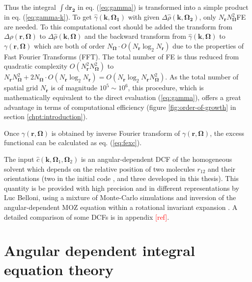 Thus the integral $\int\mathrm{d}\mathbf{r_{2}}$ in eq. (\ref{eq:gamma})
is transformed into a simple product in eq. (\ref{eq:gamma-k}). To
get $\hat{\gamma}(\mathbf{k},\mathbf{\Omega_{1}})$ with given $\Delta\hat{\rho}(\mathbf{k},\mathbf{\Omega_{2}})$,
only $N_{\mathbf{r}}N_{\mathbf{\Omega}}^{2}$\acs{FE} are needed.
To this computational cost should be added the transform from $\Delta\rho(\mathbf{r},\mathbf{\Omega})$
to $\Delta\hat{\rho}(\mathbf{k},\mathbf{\Omega})$ and the backward
transform from $\hat{\gamma}(\mathbf{k},\mathbf{\Omega})$ to $\gamma(\mathbf{r},\mathbf{\Omega})$
which are both of order $N_{\mathbf{\Omega}}\cdot O(N_{\mathbf{r}}\log_{2}N_{\mathbf{r}})$
due to the properties of Fast Fourier Transforms (\acs{FFT}). The
total number of \acs{FE} is thus reduced from quadratic complexity
$O(N_{\mathbf{r}}^{2}N_{\mathbf{\Omega}}^{2})$ to $N_{\mathbf{r}}N_{\mathbf{\Omega}}^{2}+2N_{\mathbf{\Omega}}\cdot O(N_{\mathbf{r}}\log_{2}N_{\mathbf{r}})=O(N_{\mathbf{r}}\log_{2}N_{\mathbf{r}}N_{\mathbf{\Omega}}^{2})$.
As the total number of spatial grid $N_{\mathbf{r}}$ is of magnitude
$10^{5}\sim10^{6}$, this procedure, which is mathematically equivalent
to the direct evaluation (\ref{eq:gamma}), offers a great advantage
in terms of computational efficiency (figure \ref{fig:order-of-growth}
in section \ref{chpt:introduction}).

Once $\gamma(\mathbf{r},\mathbf{\Omega})$ is obtained by inverse
Fourier transform of $\gamma(\mathbf{r},\mathbf{\Omega})$, the excess
functional can be calculated as eq. (\ref{eq:fexc}).

The input $\hat{c}(\mathbf{k},\mathbf{\Omega}_{1},\mathbf{\Omega}_{2})$
is an angular-dependent \acs{DCF} of the homogeneous solvent which
depends on the relative position of two molecules $r_{12}$ and their
orientations (two in the initial code \citep{Zhao_2011}, and three
developed in this thesis). This quantity is be provided with high
precision and in different representations by Luc Belloni, using a
mixture of Monte-Carlo simulations and inversion of the angular-dependent
\acs{MOZ} equation within a rotational invariant expansion \citep{puibasset_bridge_2012}.
A detailed comparison of some \acs{DCF}s is in appendix \textcolor{red}{{[}ref{]}}.

\section{Angular dependent integral equation theory\label{sec:Angular-dependent-iem}}

